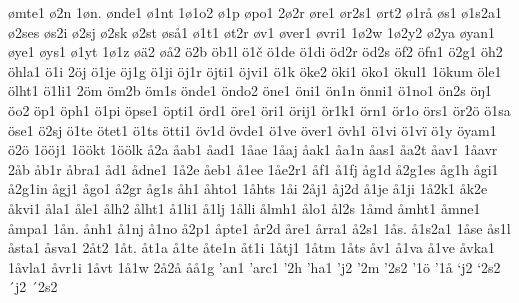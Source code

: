 ømte1
ø2n
1øn.
ønde1
ø1nt
1ø1o2
ø1p
øpo1
2ø2r
øre1
ør2s1
ørt2
ø1rå
øs1
ø1s2a1
ø2ses
øs2i
ø2sj
ø2sk
ø2st
øså1
ø1t1
øt2r
øv1
øver1
øvri1
1ø2w
1ø2y2
ø2ya
øyan1
øye1
øys1
ø1yt
1ø1z
øä2
øå2
ö2b
öb1l
ö1č
ö1de
ö1di
öd2r
öd2s
öf2
öfn1
ö2g1
öh2
öhla1
ö1i
2öj
ö1je
öj1g
ö1ji
öj1r
öjti1
öjvi1
ö1k
öke2
öki1
öko1
ökul1
1ökum
öle1
ölht1
ö1li1
2öm
öm2b
öm1s
önde1
öndo2
öne1
öni1
ön1n
önni1
ö1no1
ön2s
öŋ1
öo2
öp1
öph1
ö1pi
öpse1
öpti1
örd1
öre1
öri1
örij1
ör1k1
örn1
ör1o
örs1
ör2ö
ö1sa
öse1
ö2sj
ö1te
ötet1
ö1ts
ötti1
öv1d
övde1
ö1ve
över1
övh1
ö1vi
ö1vï
ö1y
öyam1
ö2ö
1ööj1
1öökt
1öölk
å2a
åab1
åad1
1åae
1åaj
åak1
åa1n
åas1
åa2t
åav1
1åavr
2åb
åb1r
åbra1
åd1
ådne1
1å2e
åeb1
å1ee
1åe2r1
åf1
å1fj
åg1d
å2g1es
åg1h
ågi1
å2g1in
ågj1
ågo1
å2gr
åg1s
åh1
åhto1
1åhts
1åi
2åj1
åj2d
å1je
å1ji
1å2k1
åk2e
åkvi1
åla1
åle1
ålh2
ålht1
å1li1
å1lj
1ålli
ålmh1
ålo1
ål2s
1åmd
åmht1
åmne1
åmpa1
1ån.
ånh1
å1nj
å1no
å2p1
åpte1
år2d
åre1
årra1
å2s1
1ås.
å1s2a1
1åse
ås1l
åsta1
åsva1
2åt2
1åt.
åt1a
å1te
åte1n
åt1i
1åtj1
1åtm
1åts
åv1
å1va
å1ve
åvka1
1åvla1
åvr1i
1åvt
1å1w
2å2å
åå1g
'an1
'arc1
'2h
'ha1
'j2
'2m
'2s2
'1ö
'1å
`j2
`2s2
´j2
´2s2
